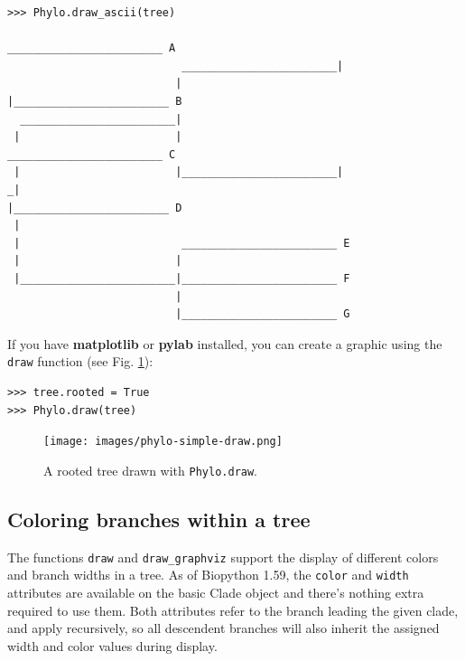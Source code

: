 \documentclass{report}
\begin{document}
\begin{verbatim}
>>> Phylo.draw_ascii(tree)
                                                    ________________________ A
                           ________________________|
                          |                        |________________________ B
  ________________________|
 |                        |                         ________________________ C
 |                        |________________________|
_|                                                 |________________________ D
 |
 |                         ________________________ E
 |                        |
 |________________________|________________________ F
                          |
                          |________________________ G

\end{verbatim}

If you have \textbf{matplotlib} or \textbf{pylab} installed, you can create a graphic
using the \verb|draw| function (see Fig. \ref{fig:phylo-simple-draw}):

\begin{verbatim}
>>> tree.rooted = True
>>> Phylo.draw(tree)
\end{verbatim}

\begin{htmlonly}
\label{fig:phylo-simple-draw}
\end{htmlonly}

\begin{latexonly}
\begin{figure}[htb]
\centering
\texttt{[image: images/phylo-simple-draw.png]}
\caption{A rooted tree drawn with {\tt Phylo.draw}.}
\label{fig:phylo-simple-draw}
\end{figure}
\end{latexonly}


\subsection{Coloring branches within a tree}

The functions \verb|draw| and \verb|draw_graphviz| support the display of different
colors and branch widths in a tree.
As of Biopython 1.59, the \verb|color| and \verb|width| attributes are available on the
basic Clade object and there's nothing extra required to use them.
Both attributes refer to the branch leading the given clade, and apply recursively, so
all descendent branches will also inherit the assigned width and color values during
display.
\end{document}
